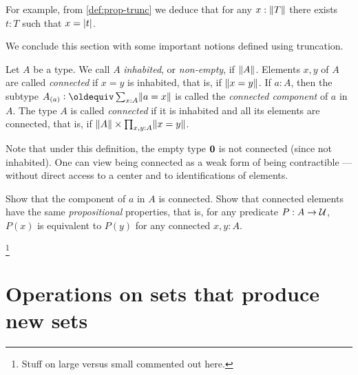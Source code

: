 For example, from \cref{def:prop-trunc} we deduce that for any $x:\lVert T\rVert$ there exists $t:T$ such that $x=\lvert t\rvert$.

We conclude this section with some important notions defined using truncation.

\begin{definition}\label{def:connected}
Let $A$ be a type. We call $A$ \emph{inhabited},
or \emph{non-empty}, if $\lVert A\rVert$.
Elements $x,y$ of $A$ are called \emph{connected} if $x=y$ is
inhabited, that is, if $\lVert x=y\rVert$.
If $a:A$, then the subtype $A_{(a)}\defeq \sum_{x:A}\Trunc{a=x}$
is called the \emph{connected component} of $a$ in $A$.
The type $A$ is called \emph{connected} if it is inhabited
and all its elements are connected, that is, if 
$\lVert A\rVert \times \prod_{x,y:A} \lVert x=y\rVert$.
\end{definition}

Note that under this definition, the empty type $\mathbf{0}$ is not connected
(since not inhabited). One can view being connected as a weak form
of being contractible --- without direct access to a center and to
identifications of elements.

\begin{xca}\label{xca:component-connected}
Show that the component of $a$ in $A$ is connected.
Show that connected elements have the same 
\emph{propositional} properties, that is, 
for any predicate $P:A\to\mathcal{U}$, $P(x)$ is equivalent
to $P(y)$ for any connected $x,y:A$. 
\end{xca}
\footnote{Stuff on large versus small commented out here.}


\section{Operations on sets that produce new sets}
\label{sec:operations-on-sets}

